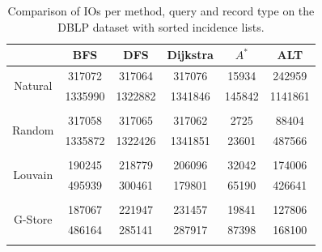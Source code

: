 \begin{table}[H]
	\begin{center}
		 \begin{tabular}[c]{c c c c c c} \toprule
			  & BFS & DFS & Dijkstra & $A^*$  & ALT \\ \midrule 
 			\multirow{2}{*}{Natural}  & 317072 & 317064 & 317076 & 15934 & 242959 \\ 
 				 & 1335990 & 1322882 & 1341846 & 145842 & 1141861 \\ 
 				&&&&& \\[-0.5em]
 			\multirow{2}{*}{Random}  & 317058 & 317065 & 317062 & 2725 & 88404 \\ 
 				 & 1335872 & 1322426 & 1341851 & 23601 & 487566 \\ 
 				&&&&& \\[-0.5em]
 			\multirow{2}{*}{Louvain}  & 190245 & 218779 & 206096 & 32042 & 174006 \\ 
 				 & 495939 & 300461 & 179801 & 65190 & 426641 \\ 
 				&&&&& \\[-0.5em]
 			\multirow{2}{*}{G-Store}  & 187067 & 221947 & 231457 & 19841 & 127806 \\ 
 				 & 486164 & 285141 & 287917 & 87398 & 168100 \\ 
 				&&&&& \\[-0.5em]
 					\end{tabular}  
  	 \end{center}
	 \caption{Comparison of IOs per method, query and record type on the DBLP dataset with sorted incidence lists.}
	 \label{dblp-s}
\end{table}

